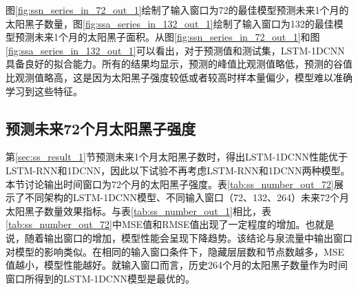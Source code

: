 图\ref{fig:ssn_series_in_72_out_1}绘制了输入窗口为72的最佳模型预测未来1个月的太阳黑子数量，图\ref{fig:ssa_series_in_132_out_1}绘制了输入窗口为132的最佳模型预测未来1个月的太阳黑子面积。从图\ref{fig:ssn_series_in_72_out_1}和图\ref{fig:ssa_series_in_132_out_1}可以看出，对于预测值和测试集，LSTM-1DCNN具备良好的拟合能力。所有的结果均显示，预测的峰值比观测值略低，预测的谷值比观测值略高，这是因为太阳黑子强度较低或者较高时样本量偏少，模型难以准确学习到这些特征。

\subsection{预测未来72个月太阳黑子强度}\label{sec:ss_result_72}

第\ref{sec:ss_result_1}节预测未来1个月太阳黑子数时，得出LSTM-1DCNN性能优于LSTM-RNN和1DCNN，因此以下试验不再考虑LSTM-RNN和1DCNN两种模型。本节讨论输出时间窗口为72个月的太阳黑子强度。表\ref{tab:ss_number_out_72}展示了不同架构的LSTM-1DCNN模型、不同输入窗口（72、132、264）未来72个月太阳黑子数量效果指标。与表\ref{tab:ss_number_out_1}相比，表\ref{tab:ss_number_out_72}中MSE值和RMSE值出现了一定程度的增加。也就是说，随着输出窗口的增加，模型性能会呈现下降趋势。该结论与泉流量中输出窗口对模型的影响类似。在相同的输入窗口条件下，隐藏层层数和节点数越多，MSE值越小，模型性能越好。就输入窗口而言，历史264个月的太阳黑子数量作为时间窗口所得到的LSTM-1DCNN模型是最优的。

